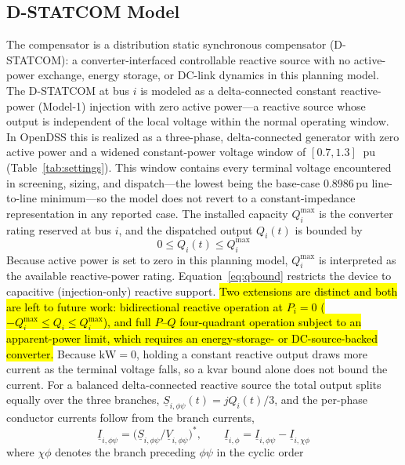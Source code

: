 \documentclass{ieeeaccess}
\newcommand{\rev}[1]{{\color{red}\hl{#1}}}
\newcommand{\rev}[1]{#1}
\newcommand{\SI}[2]{#1\,\ensuremath{\mathrm{#2}}}
\newcommand{\pu}{\text{ pu}}
\newcommand{\Qmax}{Q^{\max}}
\begin{document}
\subsection{D-STATCOM Model}
The compensator is a distribution static synchronous compensator (D-STATCOM): a
converter-interfaced controllable reactive source with no active-power exchange,
energy storage, or DC-link dynamics in this planning model. The D-STATCOM at bus
$i$ is modeled as a delta-connected constant reactive-power (Model-1) injection
with zero active power---a reactive source whose output is independent of the
local voltage within the normal operating window. In OpenDSS this is realized as a
three-phase, delta-connected generator with zero active power and a widened
constant-power voltage window of $[0.7,1.3]~\pu$
(Table~\ref{tab:settings}). This window contains every terminal voltage encountered in
screening, sizing, and dispatch---the lowest being the base-case \SI{0.8986}{pu}
line-to-line minimum---so the model does not revert to a constant-impedance
representation in any reported case. The
installed capacity $\Qmax_i$ is the converter rating reserved at bus $i$, and the
dispatched output $Q_i(t)$ is bounded by
\begin{equation}
0 \le Q_i(t) \le \Qmax_i
\label{eq:qbound}
\end{equation}
Because active power is set to zero in this planning model, $\Qmax_i$ is
interpreted as the available reactive-power rating. Equation~\eqref{eq:qbound} restricts the
device to capacitive (injection-only) reactive support. \rev{Two extensions are distinct and
both are left to future work: bidirectional reactive operation at \mbox{$P_i=0$}
(\mbox{$-\Qmax_i\le Q_i\le\Qmax_i$}), and full \mbox{$P$--$Q$} four-quadrant operation subject
to an apparent-power limit, which requires an energy-storage- or DC-source-backed converter.} Because $\mathrm{kW}=0$,
holding a constant reactive output draws more current as the terminal voltage
falls, so a kvar bound alone does not bound the current. For a balanced
delta-connected reactive source the total output splits equally over the three
branches, $\underline S_{i,\phi\psi}(t)=jQ_i(t)/3$, and the per-phase conductor
currents follow from the branch currents,
\begin{equation}
\underline I_{i,\phi\psi}=\bigl(\underline S_{i,\phi\psi}/\underline V_{i,\phi\psi}\bigr)^{\!*},
\qquad
\underline I_{i,\phi} = \underline I_{i,\phi\psi}-\underline I_{i,\chi\phi}
\label{eq:iconv}
\end{equation}
where $\chi\phi$ denotes the branch preceding $\phi\psi$ in the cyclic order
\end{document}
